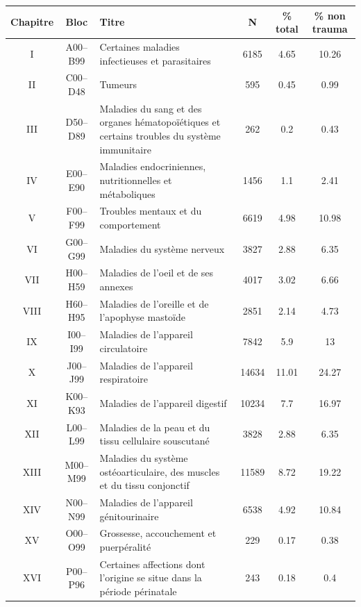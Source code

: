 \documentclass[12pt,english,french,twoside]{report}\usepackage[]{graphicx}\usepackage[]{color}
\begin{document}
\begin{longtable}{|c|c|m{4cm}|c|c|c|}
 \hline
 Chapitre & Bloc & Titre & N & \% total  & \% non trauma \\
 \hline
 
I & A00–B99 & Certaines maladies infectieuses et parasitaires & 6185 & 4.65 & 10.26 \\
 II&C00–D48&Tumeurs&595&0.45&0.99\\
 
III&D50–D89&Maladies du sang et des organes hématopoïétiques et certains troubles du système immunitaire&262&0.2&0.43\\

IV&E00–E90&Maladies endocriniennes, nutritionnelles et métaboliques&1456&1.1&2.41\\

V&F00–F99&Troubles mentaux et du comportement&6619&4.98&10.98\\

VI&G00–G99&Maladies du système nerveux&3827&2.88&6.35\\

VII & H00–H59 & Maladies de l'oeil et de ses annexes & 4017 & 3.02&6.66\\

VIII&H60–H95&Maladies de l'oreille et de l'apophyse mastoïde&2851&2.14&4.73\\

IX&I00–I99&Maladies de l'appareil circulatoire&7842&5.9&13\\

X&J00–J99&Maladies de l'appareil respiratoire&14634&11.01&24.27\\

XI&K00–K93&Maladies de l'appareil digestif&10234&7.7&16.97\\

XII&L00–L99&Maladies de la peau et du tissu cellulaire souscutané&3828&2.88&6.35\\

XIII&M00–M99&Maladies du système ostéoarticulaire, des muscles et du tissu conjonctif&11589&8.72&19.22\\

XIV&N00–N99&Maladies de l'appareil génitourinaire&6538&4.92&10.84\\

XV&O00–O99&Grossesse, accouchement et puerpéralité&229&0.17&0.38\\

XVI&P00–P96&Certaines affections dont l'origine se situe dans la période périnatale&243&0.18&0.4\\


\end{longtable}
\end{document}

